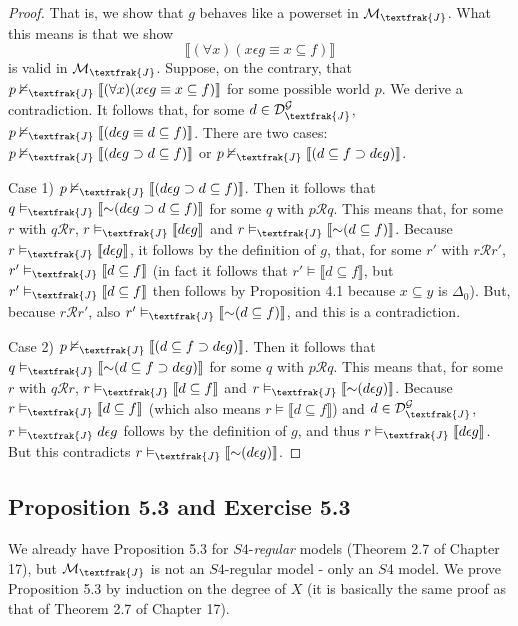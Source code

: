 \documentclass{article}
\newcommand*{\oldneg}{\mathord{\sim}}
\newcommand{\lbc}{\llbracket}
\newcommand{\rbc}{\rrbracket}
\theoremstyle{definition}
\begin{document}
\begin{proof}
That is, we show that $g$ behaves like a powerset in $\mathcal{M}_\textfrak{J}$. What this means is that we show
\[ \lbc (\forall x)(x\epsilon g\equiv x\subseteq f)\rbc \]
is valid in $\mathcal{M}_\textfrak{J}$. Suppose, on the contrary, that
$p\nvDash_\textfrak{J}\lbc(\forall x)(x\epsilon g\equiv x\subseteq f)\rbc$ for some possible world $p$. We derive a contradiction. It follows 
that, for some $d\in\mathcal{D}^\mathcal{G}_\textfrak{J}$, $p\nvDash_\textfrak{J}\lbc(d\epsilon g\equiv d\subseteq f)\rbc$. 
There are two cases: $p\nvDash_\textfrak{J}\lbc(d\epsilon g\supset d\subseteq f)\rbc$ or 
$p\nvDash_\textfrak{J}\lbc(d\subseteq f\supset d\epsilon g)\rbc$.

Case 1) $p\nvDash_\textfrak{J}\lbc(d\epsilon g\supset d\subseteq f)\rbc$. Then it follows that 
$q\vDash_\textfrak{J}\lbc\oldneg(d\epsilon g\supset d\subseteq f)\rbc$ for some $q$ with 
$p\mathcal{R}q$. This means that, for some $r$ with $q\mathcal{R}r$,
$r\vDash_\textfrak{J}\lbc d\epsilon g\rbc$ and $r\vDash_\textfrak{J}\lbc\oldneg(d\subseteq f)\rbc$. Because 
$r\vDash_\textfrak{J}\lbc d\epsilon g\rbc$, it follows by the definition of $g$, that, for some 
$r'$ with $r\mathcal{R}r'$, $r'\vDash_\textfrak{J}\lbc d\subseteq f\rbc$ (in fact it follows that 
$r'\vDash\lbc d\subseteq f\rbc$, but $r'\vDash_\textfrak{J}\lbc d\subseteq f\rbc$ then follows by Proposition 4.1 because 
$x\subseteq y$ is $\Delta_0$). But, because 
$r\mathcal{R}r'$, also $r'\vDash_\textfrak{J}\lbc\oldneg(d\subseteq f)\rbc$, and this is a contradiction.

Case 2) $p\nvDash_\textfrak{J}\lbc(d\subseteq f\supset d\epsilon g)\rbc$. Then it follows that
$q\vDash_\textfrak{J}\lbc\oldneg(d\subseteq f\supset d\epsilon g)\rbc$ for some $q$ with
$p\mathcal{R}q$. This means that, for some $r$ with $q\mathcal{R}r$,
$r\vDash_\textfrak{J}\lbc d\subseteq f\rbc$ and $r\vDash_\textfrak{J}\lbc\oldneg(d\epsilon g)\rbc$. Because 
$r\vDash_\textfrak{J}\lbc d\subseteq f\rbc$ (which also means $r\vDash\lbc d\subseteq f\rbc$) 
and $d\in\mathcal{D}^\mathcal{G}_\textfrak{J}$,
$r\vDash_\textfrak{J} d\epsilon g$ follows by the definition of $g$, and thus
$r\vDash_\textfrak{J}\lbc d\epsilon g\rbc$. But this contradicts
$r\vDash_\textfrak{J}\lbc\oldneg(d\epsilon g)\rbc$.

\end{proof}

\subsection*{Proposition 5.3 and Exercise 5.3}
We already have Proposition 5.3 for $S4$-\textit{regular} models (Theorem 2.7 of Chapter 17), but $\mathcal{M}_\textfrak{J}$ is not an 
$S4$-regular model - only an $S4$ model. We prove Proposition 5.3 by induction on the degree of $X$ (it is basically the same proof as 
that of Theorem 2.7 of Chapter 17).
\end{document}
